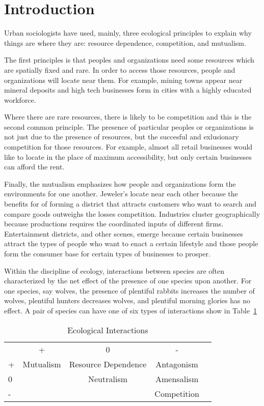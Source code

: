 \section{Introduction}
Urban sociologists have used, mainly, three ecological principles to
explain why things are where they are: resource dependence, competition,
and mutualism.

The first principles is that peoples and organizations need some
resources which are spatially fixed and rare. In order to access those
resources, people and organizations will locate near them. For
example, mining towns appear near mineral deposits and high tech
businesses form in cities with a highly educated workforce.

Where there are rare resources, there is likely to be competition and
this is the second common principle. The presence of particular
peoples or organizations is not just due to the presence of resources,
but the succesful and exlusionary competition for those resources.
For example, almost all retail businesses would like to locate in the
place of maximum accessibility, but only certain businesses can afford
the rent.

Finally, the mutualism emphasizes how people and
organizations form the environments for one another. Jeweler's locate
near each other because the benefits for of forming a district that
attracts customers who want to search and compare goods outweighs the
losses competition. Industries cluster geographically because
productions requires the coordinated inputs of different
firms. Entertainment districts, and other scenes, emerge because
certain businesses attract the types of people who want to enact a
certain lifestyle and those people form the consumer base for certain types
of businesses to prosper.

Within the discipline of ecology, interactions between species are
often characterized by the net effect of the presence of one species
upon another. For one species, say wolves, the presence of plentiful
rabbits increases the number of wolves, plentiful hunters decreases
wolves, and plentiful morning glories has no effect. A pair of species
can have one of six types of interactions show in Table~\ref{tab:ecological}

\begin{table}[h]
\centering
\begin{tabular}{lcccl}
  & +         & 0                        & -           &  \\
+ & Mutualism & Resource Dependence      & Antagonism  &  \\
0 &           & Neutralism               & Amensalism  &  \\
- &           &                          & Competition & 
\end{tabular}
\caption{Ecological Interactions}
\label{tab:ecological}
\end{table}

